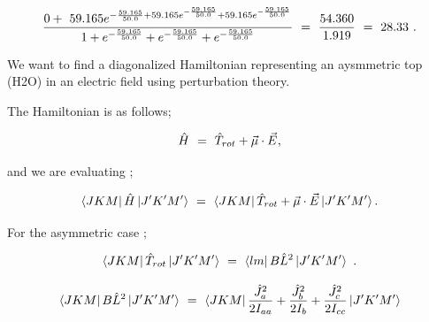 \documentclass{article}
\newcounter{subsubsubsection}[subsubsection]
\begin{document}
\begin{equation} \label{eq:281}
\frac{0 + \hspace{0.125cm} 59.165 e^{-\frac{59.165}{50.0} + 59.165 e^{-\frac{59.165}{50.0}}  + 59.165 e^{-\frac{59.165}{50.0}}}}{1 + e^{-\frac{59.165}{50.0}} + e^{-\frac{59.165}{50.0}} + e^{-\frac{59.165}{50.0}}} \hspace{0.125cm} = \hspace{0.125cm} \frac{54.360}{1.919} \hspace{0.125cm} = \hspace{0.125cm} 28.33 \hspace{0.125cm} .
\end{equation} 


We want to find a diagonalized Hamiltonian representing an aysmmetric top (H2O) in an electric field using perturbation theory. 

The Hamiltonian is as follows;

\begin{equation} \label{eq:252}
\hat{H} \hspace{0.125cm} = \hspace{0.125cm} \hat{T}_{rot} + \vec\mu\cdot\vec{E} \hspace{0.0125cm} , 
\end{equation}

and we are evaluating ; 

\begin{equation} \label{eq:253}
\bra{J K M}\hat{H}\ket{J' K' M'} \hspace{0.125cm} = \hspace{0.125cm} \bra{J K M} \hat{T}_{rot} + \vec\mu\cdot\vec{E}\ket{J' K' M'} . 
\end{equation}

For the asymmetric case ;

\begin{equation} \label{eq:254}
\bra{J K M}\hat{T}_{rot}\ket{J' K' M'} \hspace{0.125cm} = \hspace{0.125cm} \bra{l m}B\hat{L}^{2}\ket{J' K' M'} \hspace{0.125cm} .
\end{equation}

\begin{equation} \label{eq:255}
\bra{J K M}B\hat{L}^{2}\ket{J' K' M'} \hspace{0.125cm} = \hspace{0.125cm} \bra{J K M} \frac{\hat{J}_{a}^{2}}{2 I_{aa}} + \frac{\hat{J}_{b}^{2}}{2 I_{b}} + \frac{\hat{J}_{c}^{2}}{2 I_{cc}} \ket{J' K' M'}
\end{equation}
\end{document}
